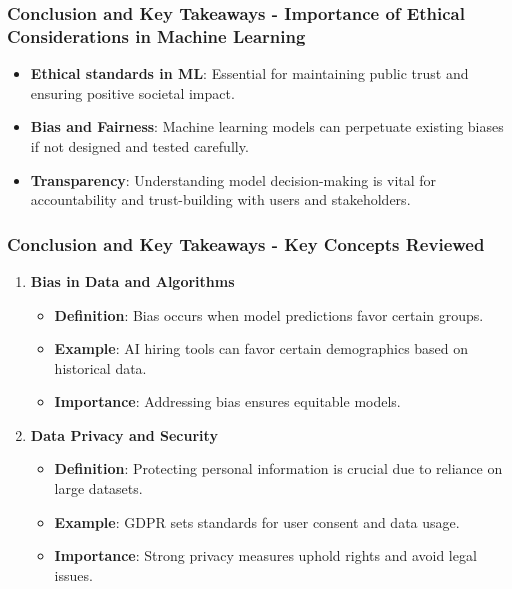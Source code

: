 \documentclass[aspectratio=169]{beamer}
\begin{document}
\begin{frame}[fragile]
  \frametitle{Conclusion and Key Takeaways - Importance of Ethical Considerations in Machine Learning}
  \begin{itemize}
    \item \textbf{Ethical standards in ML}: Essential for maintaining public trust and ensuring positive societal impact.
    \item \textbf{Bias and Fairness}: Machine learning models can perpetuate existing biases if not designed and tested carefully.
    \item \textbf{Transparency}: Understanding model decision-making is vital for accountability and trust-building with users and stakeholders.
  \end{itemize}
\end{frame}

\begin{frame}[fragile]
  \frametitle{Conclusion and Key Takeaways - Key Concepts Reviewed}
  \begin{enumerate}
    \item \textbf{Bias in Data and Algorithms}
      \begin{itemize}
        \item \textbf{Definition}: Bias occurs when model predictions favor certain groups.
        \item \textbf{Example}: AI hiring tools can favor certain demographics based on historical data.
        \item \textbf{Importance}: Addressing bias ensures equitable models.
      \end{itemize}
    
    \item \textbf{Data Privacy and Security}
      \begin{itemize}
        \item \textbf{Definition}: Protecting personal information is crucial due to reliance on large datasets.
        \item \textbf{Example}: GDPR sets standards for user consent and data usage.
        \item \textbf{Importance}: Strong privacy measures uphold rights and avoid legal issues.
      \end{itemize}
  \end{enumerate}
\end{frame}
\end{document}
